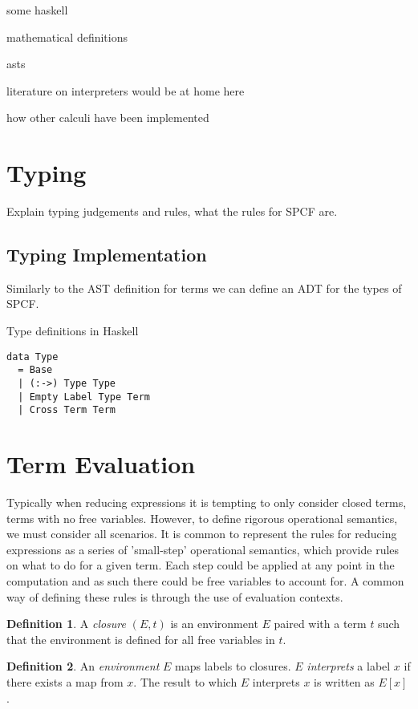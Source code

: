 \documentclass[12pt,a4paper]{report}
\theoremstyle{definition}
\newtheorem{definition}{Definition}[section]
\theoremstyle{remark}
\begin{document}
some haskell

mathematical definitions

asts

literature on interpreters would be at home here

how other calculi have been implemented

\section{Typing}
Explain typing judgements and rules, what the rules for SPCF are.

\subsection{Typing Implementation}
Similarly to the AST definition for terms we can define an ADT for the types of SPCF.

\begin{listing}[!ht]
\caption{Type definitions in Haskell}
\begin{verbatim}
data Type
  = Base  
  | (:->) Type Type
  | Empty Label Type Term
  | Cross Term Term
\end{verbatim}
\label{listing:type-adt}
\end{listing}

\section{Term Evaluation}
Typically when reducing expressions it is tempting to only consider closed terms, terms with no free
variables. However, to define rigorous operational semantics, we must consider all scenarios. It is common to represent the rules for reducing expressions as a series of 'small-step' operational semantics, which provide rules on what to do for a given term. Each step could be applied at any point in the computation and as such there could be free variables to account for. A common way of defining these rules is through the use of evaluation contexts.

\begin{definition}
    A \emph{closure} $(E, t)$ is an environment $E$ paired with a term $t$ such that the environment is defined for all free variables in $t$.
\end{definition}

\begin{definition}
    An \emph{environment} $E$ maps labels to closures. $E$ \emph{interprets} a label $x$ if there exists a map from $x$. The result to which $E$ interprets $x$ is written as $E[x]$.
\end{definition}
\end{document}
